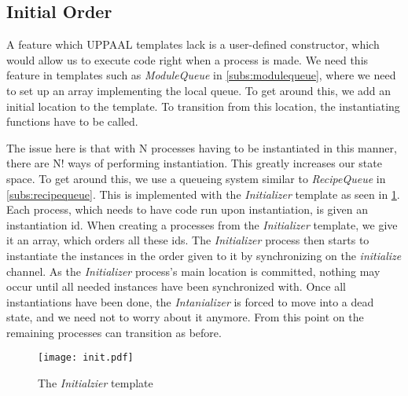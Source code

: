 

\subsection{Initial Order}
A feature which UPPAAL templates lack is a user-defined constructor, which would allow us to execute code right when a process is made. We need this feature in templates such as \emph{ModuleQueue} in \cref{subs:modulequeue}, where we need to set up an array implementing the local queue. To get around this, we add an initial location to the template. To transition from this location, the instantiating functions have to be called.

The issue here is that with N processes having to be instantiated in this manner, there are N! ways of performing instantiation. This greatly increases our state space. To get around this, we use a queueing system similar to \emph{RecipeQueue} in \cref{subs:recipequeue}. This is implemented with the \emph{Initializer} template as seen in \cref{fig:initializer}. Each process, which needs to have code run upon instantiation, is given an instantiation id. When creating a processes from the \emph{Initializer} template, we give it an array, which orders all these ids. The \emph{Initializer} process then starts to instantiate the instances in the order given to it by synchronizing on the \emph{initialize} channel. As the \emph{Initializer} process's main location is committed, nothing may occur until all needed instances have been synchronized with. Once all instantiations have been done, the \emph{Intanializer} is forced to move into a dead state, and we need not to worry about it anymore. From this point on the remaining  processes can transition as before. 

\begin{figure}[h]
\centering
\texttt{[image: init.pdf]}
\caption{The \textit{Initialzier} template}
\label{fig:initializer}
\end{figure}

